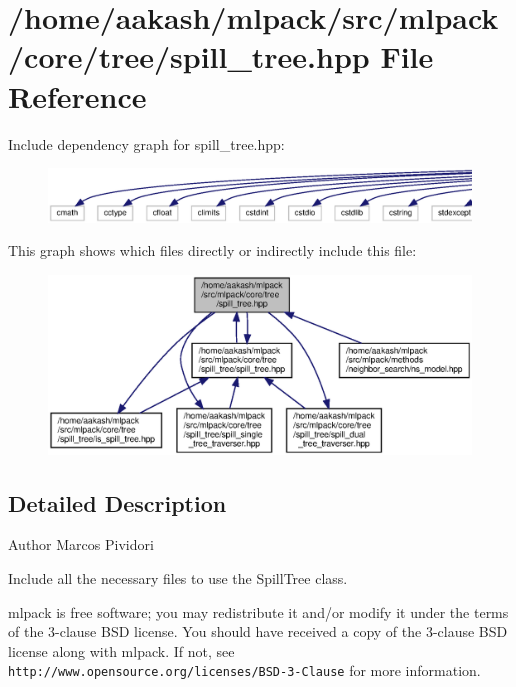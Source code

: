 \section{/home/aakash/mlpack/src/mlpack/core/tree/spill\+\_\+tree.hpp File Reference}
\label{spill__tree_8hpp}
Include dependency graph for spill\+\_\+tree.\+hpp\+:
\nopagebreak
\begin{figure}[H]
\begin{center}
\leavevmode
\includegraphics[width=350pt]{spill__tree_8hpp__incl}
\end{center}
\end{figure}
This graph shows which files directly or indirectly include this file\+:
\nopagebreak
\begin{figure}[H]
\begin{center}
\leavevmode
\includegraphics[width=350pt]{spill__tree_8hpp__dep__incl}
\end{center}
\end{figure}


\subsection{Detailed Description}
\begin{DoxyAuthor}{Author}
Marcos Pividori
\end{DoxyAuthor}
Include all the necessary files to use the Spill\+Tree class.

mlpack is free software; you may redistribute it and/or modify it under the terms of the 3-\/clause B\+SD license. You should have received a copy of the 3-\/clause B\+SD license along with mlpack. If not, see {\tt http\+://www.\+opensource.\+org/licenses/\+B\+S\+D-\/3-\/\+Clause} for more information. 